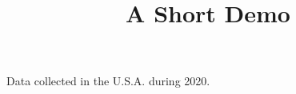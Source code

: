 \documentclass[article]{jss}
\title{A Short Demo}
\begin{document}
Data collected in the U.S.A. during 2020.
\end{document}

